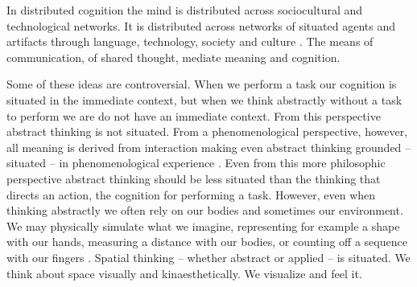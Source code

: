 \documentclass{article}
\begin{document}
In distributed cognition the mind is distributed across sociocultural and technological networks. It is distributed across networks of situated agents and artifacts through language, technology, society and culture \citep{Hardy-Vallee2008}. 
The means of communication, of shared thought, mediate meaning and cognition.  


Some of these ideas are controversial. 
When we perform a task our cognition is situated in the immediate context, 
but when we think abstractly without a task to perform we are do not have an immediate context\citep{Wilson2002}. From this perspective abstract thinking is not situated. 
From a phenomenological perspective, however, all meaning is derived from interaction
making even abstract thinking grounded -- situated -- in phenomenological experience \citep{Dourish2001}.  
Even from this more philosophic perspective abstract thinking should be less situated than the thinking that directs an action, the cognition for performing a task. However, even when thinking abstractly we often rely on our bodies and sometimes our environment. We may physically simulate what we imagine, representing for example a shape with our hands, measuring a distance with our bodies, or counting off a sequence with our fingers \citep{Wilson2002}. 
Spatial thinking -- whether abstract or applied -- is situated. We think about space visually and kinaesthetically. We visualize and feel it. 

\end{document}
